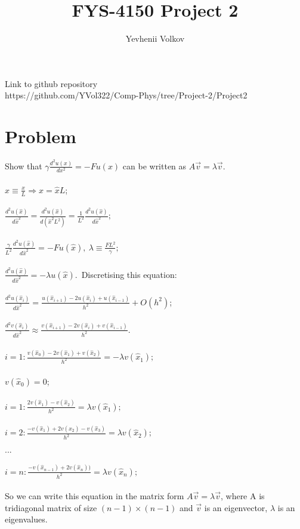 \documentclass{article}
\begin{document}
\title{FYS-4150 Project 2}
\author{Yevhenii Volkov}
\maketitle

Link to github repository \\
https://github.com/YVol322/Comp-Phys/tree/Project-2/Project2

\section{Problem}
Show that $ \gamma \frac{d^2 u(x)}{dx^2}  =-Fu(x) $ can be written as $ A \vec v = \lambda \vec v $.\\
\\
$ \hat x \equiv \frac{x}{L} \Rightarrow x =\hat x L$;\\
\\
$\frac{d^2 u(\hat x)}{d \hat x^2} = \frac{d^2 u(\hat x)}{d(\hat x^2 L^2)} = \frac{1}{L^2}\frac{d^2 u(\hat x)}{d\hat x^2};$ \\
\\$\frac{\gamma}{L^2}\frac{d^2 u(\hat x)}{d\hat x^2}=-Fu(\hat x),\ \lambda \equiv \frac{FL^2}{\gamma};$\\
\\
$\frac{d^2 u(\hat x)}{d\hat x^2} =- \lambda u(\hat x). $\ Discretising this equation:\\
\\
$\frac{d^2u(\hat x_i)}{d \hat x^2} = \frac{u(\hat x_{i+1}) - 2u(\hat x_{i})+u(\hat x_{i-1})}{h^2} + O(h^2)$;\\
\\
$\frac{d^2v(\hat x_i)}{d \hat x^2} \approx \frac{v(\hat x_{i+1}) - 2v(\hat x_{i})+v(\hat x_{i-1})}{h^2}$.\\
\\
$i = 1: \frac{v(\hat x_{0}) - 2v(\hat x_{1})+v(\hat x_{2})}{h^2} = -\lambda v(\hat x_1);$\\
\\
$v(\hat x_{0}) = 0$;\\
\\
$ i= 1: \frac{2v(\hat x_{1})-v(\hat x_{2})}{h^2} = \lambda v(\hat x_1);$\\
\\
$ i= 2: \frac{-v(\hat x_{1}) + 2v(\hat x_{2})-v(\hat x_{3})}{h^2} = \lambda v(\hat x_2);$\\
\\
$...$\\
\\
$ i= n: \frac{-v(\hat x_{n-1}) + 2v(\hat x_{n}))}{h^2} = \lambda v(\hat x_n);$\\
\\
So we can write this equation in the matrix form $ A \vec v = \lambda \vec v $, where A is tridiagonal matrix of size $(n-1)\times(n-1)$ and $\vec v$ is an eigenvector, $\lambda$ is an eigenvalues.
\end{document}
